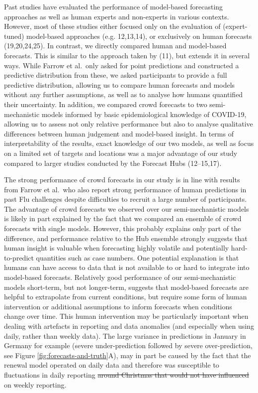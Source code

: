 \documentclass[
]{article}
\providecommand{\DIFaddtex}[1]{{\protect\color{blue}\uwave{#1}}} %
\providecommand{\DIFdeltex}[1]{{\protect\color{red}\sout{#1}}}                      %
\providecommand{\DIFaddbegin}{} %
\providecommand{\DIFaddend}{} %
\providecommand{\DIFdelbegin}{} %
\providecommand{\DIFdelend}{} %
\providecommand{\DIFadd}[1]{\texorpdfstring{\DIFaddtex{#1}}{#1}} %
\providecommand{\DIFdel}[1]{\texorpdfstring{\DIFdeltex{#1}}{}} %
\newcommand{\DIFscaledelfig}{0.5}
\newlength{\DIFdelgraphicswidth} %
\newlength{\DIFdelgraphicsheight} %
\newcommand{\DIFaddincludegraphics}[2][]{{\color{blue}\fbox{\DIFOincludegraphics[#1]{#2}}}} %
\newcommand{\DIFdelincludegraphics}[2][]{%
\sbox{\DIFdelgraphicsbox}{\DIFOincludegraphics[#1]{#2}}%
\settoboxwidth{\DIFdelgraphicswidth}{\DIFdelgraphicsbox} %
\settoboxtotalheight{\DIFdelgraphicsheight}{\DIFdelgraphicsbox} %
\scalebox{\DIFscaledelfig}{%
\parbox[b]{\DIFdelgraphicswidth}{\usebox{\DIFdelgraphicsbox}\\[-\baselineskip] \rule{\DIFdelgraphicswidth}{0em}}\llap{\resizebox{\DIFdelgraphicswidth}{\DIFdelgraphicsheight}{%
\setlength{\unitlength}{\DIFdelgraphicswidth}%
\begin{picture}(1,1)%
\thicklines\linethickness{2pt} %
{\color[rgb]{1,0,0}\put(0,0){\framebox(1,1){}}}%
{\color[rgb]{1,0,0}\put(0,0){\line( 1,1){1}}}%
{\color[rgb]{1,0,0}\put(0,1){\line(1,-1){1}}}%
\end{picture}%
}\hspace*{3pt}}} %
} %
\DeclareRobustCommand{\DIFaddbegin}{\DIFOaddbegin \let\includegraphics\DIFaddincludegraphics} %
\DeclareRobustCommand{\DIFaddend}{\DIFOaddend \let\includegraphics\DIFOincludegraphics} %
\DeclareRobustCommand{\DIFdelbegin}{\DIFOdelbegin \let\includegraphics\DIFdelincludegraphics} %
\DeclareRobustCommand{\DIFdelend}{\DIFOaddend \let\includegraphics\DIFOincludegraphics} %
\begin{document}
Past studies have evaluated the performance of model-based forecasting approaches as well as human experts and non-experts in various contexts. However, most of these studies either focused only on the evaluation of (expert-tuned) model-based approaches (e.g. 12,13,14), or exclusively on human forecasts (19,20,24,25). In contrast, we directly compared human and model-based forecasts. This is similar to the approach taken by (11), but extends it in several ways. While Farrow et al.~only asked for point predictions and constructed a predictive distribution from these, we asked participants to provide a full predictive distribution, allowing us to compare human forecasts and models without any further assumptions, as well as to analyse how humans quantified their uncertainty. In addition, we compared crowd forecasts to two semi-mechanistic models informed by basic epidemiological knowledge of COVID-19, allowing us to assess not only relative performance but also to analyse qualitative differences between human judgement and model-based insight. In terms of interpretability of the results, exact knowledge of our two models, as well as focus on a limited set of targets and locations was a major advantage of our study compared to larger studies conducted by the Forecast Hubs (12--15,17).

The strong performance of crowd forecasts in our study is in line with results from Farrow et al.~who also report strong performance of human predictions in past Flu challenges despite difficulties to recruit a large number of participants. The advantage of crowd forecasts we observed over our semi-mechanistic models is likely in part explained by the fact that we compared an ensemble of crowd forecasts with single models. However, this probably explains only part of the difference, and performance relative to the Hub ensemble strongly suggests that human insight is valuable when forecasting highly volatile and potentially hard-to-predict quantities such as case numbers. One potential explanation is that humans can have access to data that is not available to or hard to integrate into model-based forecasts. Relatively good performance of our semi-mechanistic models short-term, but not longer-term, suggests that model-based forecasts are helpful to extrapolate from current conditions, but require some form of human intervention or additional assumptions to inform forecasts when conditions change over time. This human intervention may be particularly important when dealing with artefacts in reporting and data anomalies (and especially when using daily, rather than weekly data). The large variance in predictions in January in Germany for example (severe under-prediction followed by severe over-prediction, see Figure \ref{fig:forecasts-and-truth}A), may in part be caused by the fact that the renewal model operated on daily data and therefore was susceptible to fluctuations in daily reporting \DIFdelbegin \DIFdel{around Christmas that would not have influenced }\DIFdelend \DIFaddbegin \DIFadd{which have less of an influence }\DIFaddend on weekly reporting.
\end{document}
